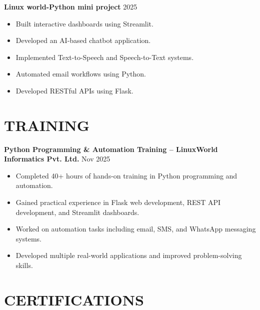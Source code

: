 \documentclass[a4paper,10pt]{article}
\begin{document}
\vspace{13pt}
\noindent
\textbf{Linux world-Python mini project} \hfill 2025\\[-10pt]
\begin{itemize}[leftmargin=*, itemsep=2pt, topsep=2pt, parsep=0pt]
\item Built interactive dashboards using Streamlit.
\item Developed an AI-based chatbot application.
\item Implemented Text-to-Speech and Speech-to-Text systems.
\item Automated email workflows using Python.
\item Developed RESTful APIs using Flask.
\end{itemize}


\vspace{13pt}  %

\noindent




\section*{TRAINING}

\noindent
\textbf{Python Programming \& Automation Training – LinuxWorld Informatics Pvt. Ltd.} \hfill Nov 2025\\[-4pt]
\begin{itemize}[leftmargin=*, itemsep=2pt, topsep=2pt, parsep=0pt]
\item Completed 40+ hours of hands-on training in Python programming and automation.
\item Gained practical experience in Flask web development, REST API development, and Streamlit dashboards.
\item Worked on automation tasks including email, SMS, and WhatsApp messaging systems.
\item Developed multiple real-world applications and improved problem-solving skills.
\end{itemize}
\section*{CERTIFICATIONS}
\end{document}
